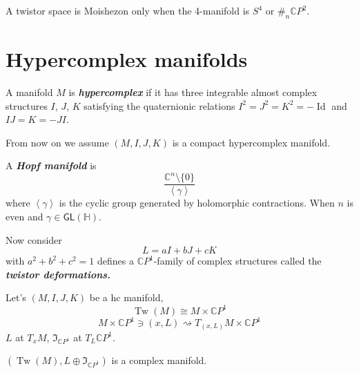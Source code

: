\begin{thm}[F. Campana]\leavevmode
	A twistor space is Moishezon only when the 4-manifold is $S^4$ or $\#_n\mathbb{C}P^{2}$.
\end{thm}

\section{Hypercomplex manifolds}

\begin{defn}\leavevmode
	A manifold $M$ is \textit{\textbf{hypercomplex}} if it has three integrable almost complex structures  $I$,  $J$, $K$ satisfying the quaternionic relations $I^2=J^2=K^2=-\operatorname{Id}$ and $I J=K=-J I$.
\end{defn}

From now on we assume $(M,I,J,K)$ is a compact hypercomplex manifold.

\begin{example}\leavevmode
	A \textit{\textbf{Hopf manifold }} is
	\[\dfrac{\mathbb{C}^n\setminus \{0\}}{\left<\gamma\right> }\]
	where $\left<\gamma\right> $ is the cyclic group generated by holomorphic contractions. When $n$ is even and $\gamma\in\mathsf{GL}(\mathbb{H})$.
\end{example}

Now consider 
\[L=a I+b J + c K \]
with $a^2+b^2+c^2=1$ defines a $\mathbb{C}P^{1}$-family of complex structures called the \textit{\textbf{twistor deformations.}}

 \begin{defn}\leavevmode
	Let's $(M,I,J,K)$ be a hc manifold,
\[\operatorname{Tw}(M)\cong M\times \mathbb{C}P^{1}\]
\[M\times \mathbb{C}P^{1} \ni(x,L)\rightsquigarrow T_{(x,L)}M\times \mathbb{C}P^{1}\]
$L$ at  $T_xM$,  $\mathfrak{I}_{\mathbb{C}P^{1}}$ at $T_L\mathbb{C}P^{1}$.
\end{defn}


\begin{thm}\leavevmode
	$(\operatorname{Tw}(M),L\oplus \mathfrak{I}_{\mathbb{C}P^{1}})$ is a complex manifold.
\end{thm}

